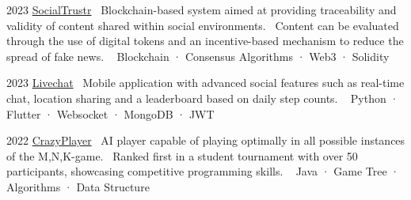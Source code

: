 \documentclass{tccv}
\begin{document}
\begin{yearlist}

\item{2023}
     {\href{https://github.com/manuelarto/socialtrustr}{SocialTrustr}}
     {\textbullet~Blockchain-based system aimed at providing traceability and validity of content shared within social environments.
     \textbullet~Content can be evaluated through the use of digital tokens and an incentive-based mechanism to reduce the spread of fake news. \newline
     \textbullet~ Blockchain · Consensus Algorithms · Web3 · Solidity}
\item{2023}
     {\href{https://github.com/manuelarto/livechat}{Livechat}}
     {\textbullet~Mobile application with advanced social features such as real-time chat, location sharing and a leaderboard based on daily step counts. \newline
    \textbullet~ Python · Flutter · Websocket · MongoDB · JWT}
\item{2022}
     {\href{https://github.com/manuelarto/crazyplayer}{CrazyPlayer}}
     {\textbullet~AI player capable of playing optimally in all possible instances of the M,N,K-game. \newline
     \textbullet~Ranked first in a student tournament with over 50 participants, showcasing competitive programming skills. \newline
    \textbullet~ Java · Game Tree · Algorithms · Data Structure}

\end{yearlist}






\end{document}
